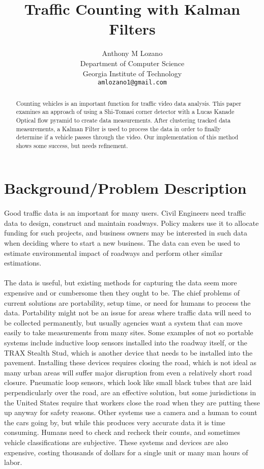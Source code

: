 \documentclass{article} %
\title{Traffic Counting with Kalman Filters}
\author{
Anthony M Lozano\\
Department of Computer Science\\
Georgia Institute of Technology\\
\texttt{amlozano1@gmail.com} \\
}
\begin{document}
\maketitle

\begin{abstract}
Counting vehicles is an important function for traffic video data analysis. This paper examines an approach of using a Shi-Tomasi corner detector with a Lucas Kanade Optical flow pyramid to create data measurements. After clustering tracked data measurements, a Kalman Filter is used to process the data in order to finally determine if a vehicle passes through the video. Our implementation of this method shows some success, but needs refinement.
\end{abstract}

\section{Background/Problem Description}

\paragraph*{}Good traffic data is an important for many users.  Civil Engineers need traffic data to design, construct and maintain roadways.  Policy makers use it to allocate funding for such projects, and business owners may be interested in such data when deciding where to start a new business.  The data can even be used to estimate environmental impact of roadways and perform other similar estimations.
\paragraph*{}The data is useful, but existing methods for capturing the data seem more expensive and or cumbersome then they ought to be.  The chief problems of current solutions are portability, setup time, or need for humans to process the data.  Portability might not be an issue for areas where traffic data will need to be collected permanently, but usually agencies want a system that can move easily to take measurements from many sites.  Some examples of not so portable systems include inductive loop sensors installed into the roadway itself, or the TRAX Stealth Stud, which is another device that needs to be installed into the pavement.  Installing these devices requires closing the road, which is not ideal as many urban areas will suffer major disruption from even a relatively short road closure.  Pneumatic loop sensors, which look like small black tubes that are laid perpendicularly over the road, are an effective solution, but some jurisdictions in the United States require that workers close the road when they are putting these up anyway for safety reasons.  Other systems use a camera and a human to count the cars going by, but while this produces very accurate data it is time consuming.  Humans need to check and recheck their counts, and sometimes vehicle classifications are subjective.  These systems and devices are also expensive, costing thousands of dollars for a single unit or many man hours of labor.
\end{document}
